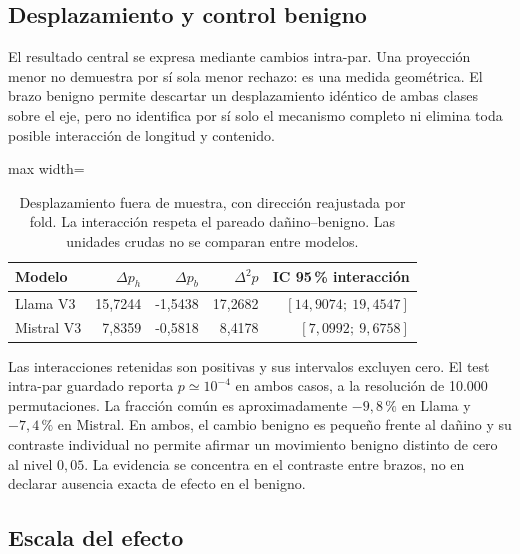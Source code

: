 \subsection{Desplazamiento y control benigno}
\label{sec:desplazamiento}

El resultado central se expresa mediante cambios intra-par. Una proyección menor no demuestra por sí sola menor rechazo: es una medida geométrica. El brazo benigno permite descartar un desplazamiento idéntico de ambas clases sobre el eje, pero no identifica por sí solo el mecanismo completo ni elimina toda posible interacción de longitud y contenido.
\begin{table}[htbp]\centering\small
\begin{adjustbox}{max width=\textwidth}
\begin{tabular}{@{}lrrrr@{}}\toprule
Modelo & $\Delta p_h$ & $\Delta p_b$ & $\Delta^2p$ & IC 95\,\% interacción \\\midrule
Llama V3 & 15{,}7244 & -1{,}5438 & 17{,}2682 & $[14{,}9074;\ 19{,}4547]$ \\
Mistral V3 & 7{,}8359 & -0{,}5818 & 8{,}4178 & $[7{,}0992;\ 9{,}6758]$ \\
\bottomrule\end{tabular}\end{adjustbox}
\caption{Desplazamiento fuera de muestra, con dirección reajustada por fold. La interacción respeta el pareado dañino--benigno. Las unidades crudas no se comparan entre modelos.}\label{tab:gap}\end{table}

Las interacciones retenidas son positivas y sus intervalos excluyen cero. El test intra-par guardado reporta $p\simeq 10^{-4}$ en ambos casos, a la resolución de 10.000 permutaciones. La fracción común es aproximadamente $-9{,}8\,\%$ en Llama y $-7{,}4\,\%$ en Mistral. En ambos, el cambio benigno es pequeño frente al dañino y su contraste individual no permite afirmar un movimiento benigno distinto de cero al nivel $0{,}05$. La evidencia se concentra en el contraste entre brazos, no en declarar ausencia exacta de efecto en el benigno.

\subsection{Escala del efecto}
\label{sec:escala}

